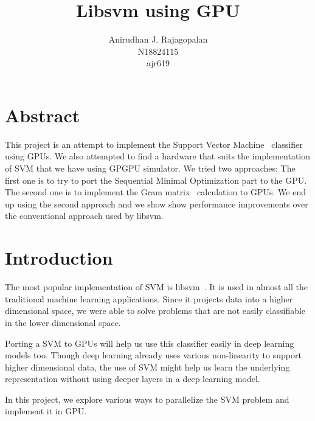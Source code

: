 \documentclass{article}
\begin{document}
\title{Libsvm using GPU}
\author{Anirudhan J. Rajagopalan \\ N18824115 \\ ajr619}
\maketitle




\newpage

\section{Abstract}
This project is an attempt to implement the Support Vector Machine~\cite{cortes1995} classifier using GPUs.  We also attempted to find a hardware that suits the implementation of SVM that we have using GPGPU simulator.
We tried two approaches: 
The first one is to try to port the Sequential Minimal Optimization part to the GPU\@.
The second one is to implement the Gram matrix~\cite{wiki:gram_matrix} calculation to GPUs.
We end up using the second approach and we show show performance improvements over the conventional approach used by libsvm. 
\section{Introduction}
The most popular implementation of SVM is libsvm~\cite{CC01a}.  
It is used in almost all the traditional machine learning applications.
Since it projects data into a higher dimensional space, we were able to solve problems that are not easily classifiable in the lower dimensional space.

Porting a SVM to GPUs will help us use this classifier easily in deep learning models too.
Though deep learning already uses various non-linearity to support higher dimensional data, the use of SVM might help us learn the underlying representation without using deeper layers in a deep learning model.

In this project, we explore various ways to parallelize the SVM problem and implement it in GPU\@.
\end{document}
